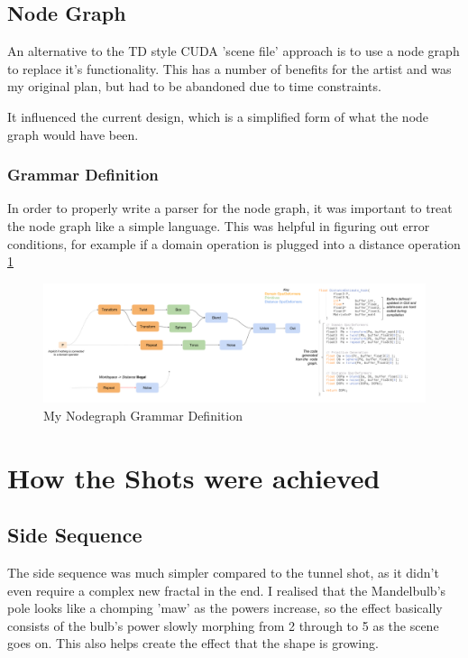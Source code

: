 \documentclass[11pt,a4paper,final,notitlepage]{report}
\begin{document}
\subsection{Node Graph}
An alternative to the TD style CUDA 'scene file' approach is to use a node graph to replace it's functionality. This has a number of benefits for the artist and was my original plan, but had to be abandoned due to time constraints. 

It influenced the current design, which is a simplified form of what the node graph would have been.

\subsubsection{Grammar Definition}
In order to properly write a parser for the node graph, it was important to treat the node graph like a simple language. This was helpful in figuring out error conditions, for example if a domain operation is plugged into a distance operation \ref{fig:grammar}

\begin{figure}[h!]
	\includegraphics[scale=0.25]{nodegrammar}
	\caption{My Nodegraph Grammar Definition}
	\label{fig:grammar}
\end{figure}



\section{How the Shots were achieved}
\subsection{Side Sequence}

The side sequence was much simpler compared to the tunnel shot, as it didn't even require a complex new fractal in the end. I realised that the Mandelbulb's pole looks like a chomping 'maw' as the powers increase, so the effect basically consists of the bulb's power slowly morphing from 2 through to 5 as the scene goes on. This also helps create the effect that the shape is growing.
\end{document}
